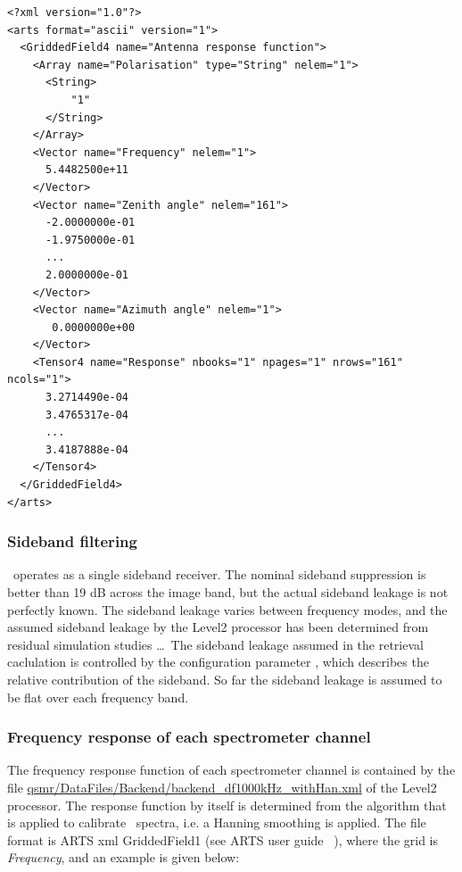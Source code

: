 %
\lstset{language=XML}
\begin{lstlisting}
<?xml version="1.0"?>
<arts format="ascii" version="1">
  <GriddedField4 name="Antenna response function">
    <Array name="Polarisation" type="String" nelem="1">
      <String>
          "1"
      </String>
    </Array>
    <Vector name="Frequency" nelem="1">
      5.4482500e+11
    </Vector>
    <Vector name="Zenith angle" nelem="161">
      -2.0000000e-01
      -1.9750000e-01
      ...
      2.0000000e-01
    </Vector>
    <Vector name="Azimuth angle" nelem="1">     
       0.0000000e+00
    </Vector>
    <Tensor4 name="Response" nbooks="1" npages="1" nrows="161" ncols="1">
      3.2714490e-04
      3.4765317e-04 
      ...
      3.4187888e-04 
    </Tensor4>
  </GriddedField4>
</arts>
\end{lstlisting}

\subsubsection*{Sideband filtering}


\smr\ operates as a single sideband receiver. 
The nominal sideband suppression is better than 19 dB across the image band,
but the actual sideband leakage is not perfectly known.
The sideband leakage varies between frequency modes, and the
assumed sideband leakage by the Level2 processor has been determined
from residual simulation studies \dots{}\
The sideband leakage assumed in the retrieval caclulation
is controlled by the configuration parameter ,
which describes the relative contribution of the sideband. So far the sideband 
leakage is assumed to be flat over each frequency band.

\subsubsection*{Frequency response of each spectrometer channel}

The frequency response function of each spectrometer channel
is contained by the file
\url{qsmr/DataFiles/Backend/backend\_df1000kHz\_withHan.xml}
of the Level2 processor.
The response function by itself is determined from
the algorithm that is applied to calibrate \smr\ spectra,
i.e. a Hanning smoothing is applied.
The file format is ARTS xml GriddedField1 (see ARTS user guide ~\citep{artsug}),
where the grid is \emph{Frequency}, and an example is given below:

